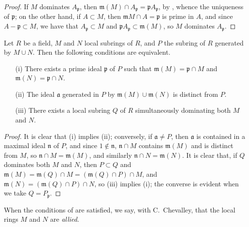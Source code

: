 \begin{proof}
If $M$ dominates $A_\mathfrak{p}$, then $\mathfrak{m}(M)\cap A_\mathfrak{p}=\mathfrak{p}A_\mathfrak{p}$, by , whence the uniqueness of $\mathfrak{p}$;
on the other hand, if $A\subset M$, then $\mathfrak{m}M\cap A=\mathfrak{p}$ is prime in $A$, and since $A-\mathfrak{p}\subset M$, we have that $A_\mathfrak{p}\subset M$ and $\mathfrak{p}A_\mathfrak{p}\subset\mathfrak{m}(M)$, so $M$ dominates $A_\mathfrak{p}$.
\end{proof}

\begin{lemma}[8.1.4]
\label{I.8.1.4}
Let $R$ be a field, $M$ and $N$ local subrings of $R$, and $P$ the subring of $R$ generated by $M\cup N$.
Then the following conditions are equivalent.
\begin{enumerate}
  \item[{\rm(i)}] There exists a prime ideal $\mathfrak{p}$ of $P$ such that $\mathfrak{m}(M)=\mathfrak{p}\cap M$ and $\mathfrak{m}(N)=\mathfrak{p}\cap N$.
  \item[{\rm(ii)}] The ideal $\mathfrak{a}$ generated in $P$ by $\mathfrak{m}(M)\cup\mathfrak{m}(N)$ is distinct from $P$.
  \item[{\rm(iii)}] There exists a local subring $Q$ of $R$ simultaneously dominating both $M$ and $N$.
\end{enumerate}
\end{lemma}

\begin{proof}
It is clear that (i) implies (ii);
conversely, if $\mathfrak{a}\neq P$, then $\mathfrak{a}$ is contained in a maximal ideal $\mathfrak{n}$ of $P$, and since $1\not\in\mathfrak{n}$, $\mathfrak{n}\cap M$ contains $\mathfrak{m}(M)$ and is distinct from $M$, so $\mathfrak{n}\cap M=\mathfrak{m}(M)$, and similarly $\mathfrak{n}\cap N=\mathfrak{m}(N)$.
It is clear that, if $Q$ dominates both $M$ and $N$, then $P\subset Q$ and $\mathfrak{m}(M)=\mathfrak{m}(Q)\cap M=(\mathfrak{m}(Q)\cap P)\cap M$, and $\mathfrak{m}(N)=(\mathfrak{m}(Q)\cap P)\cap N$, so (iii) implies (i);
the converse is evident when we take $Q=P_\mathfrak{p}$.
\end{proof}

When the conditions of  are satisfied, we say, with C.~Chevalley, that the local rings $M$ and $N$ are \emph{allied}.

